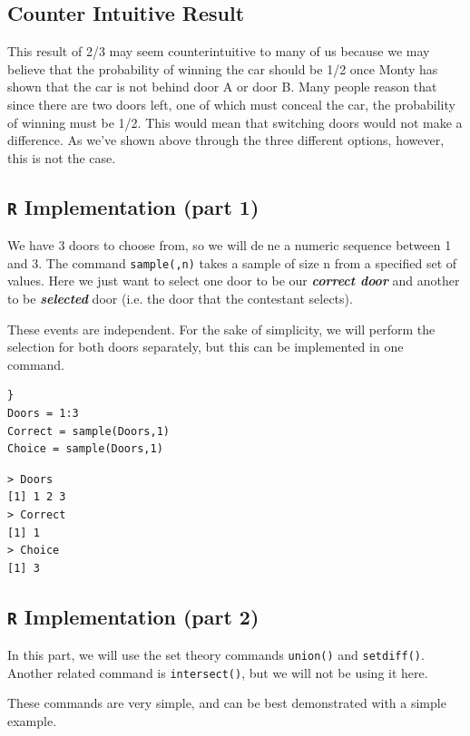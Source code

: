 \documentclass[11pt]{article} %
\begin{document}
\subsection{Counter Intuitive Result}
This result of 2/3 may seem counterintuitive to many of us because we may believe that the probability of winning the car should be 1/2 once Monty has shown that the car is not behind door A or door B. Many people reason that since there are two doors left, one of which must conceal the car, the probability of winning must be 1/2. This would mean that switching doors would not make a difference. As we've shown above through the three different options, however, this is not the case.


\subsection{ \texttt{R} Implementation (part 1)}
We have 3 doors to choose from, so we will dene a numeric sequence between 1 and 3. The
command \texttt{sample(,n)} takes a sample of size n from a specified set of values. Here we just
want to select one door to be our \textbf{\textit{correct door}} and another to be \textbf{\textit{selected}} door (i.e. the door that the contestant selects).

These events are independent. For the sake of simplicity, we will perform the selection for both doors separately, but this can be implemented in one command.

\begin{verbatim}}
Doors = 1:3 
Correct = sample(Doors,1)
Choice = sample(Doors,1)
\end{verbatim}



\begin{verbatim}
> Doors
[1] 1 2 3
> Correct
[1] 1
> Choice
[1] 3
\end{verbatim}


\subsection{ \texttt{R} Implementation (part 2)}
In this part, we will use the set theory commands \texttt{union()} and \texttt{setdiff()}. Another related command is \texttt{intersect()}, but we will not be using it here.

These commands are very simple, and can be best demonstrated with a simple example.
\end{document}
